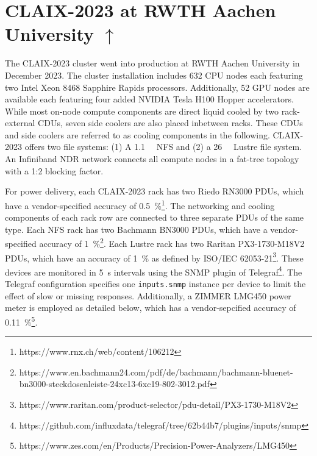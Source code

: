 \section[CLAIX-2023 at RWTH Aachen University]{CLAIX-2023 at RWTH Aachen University \hyperref[tab:examples-overview]{$\uparrow$}}
\label{sec:example-rwth-claix-2023}

The CLAIX-2023 cluster went into production at RWTH Aachen University in December 2023.
The cluster installation includes 632 CPU nodes each featuring two Intel Xeon 8468 Sapphire Rapids processors.
Additionally, 52 GPU nodes are available each featuring four added NVIDIA Tesla H100 Hopper accelerators.
While most on-node compute components are direct liquid cooled by two rack-external \acp{CDU}, seven side coolers are also placed inbetween racks.
These \acp{CDU} and side coolers are referred to as cooling components in the following.
CLAIX-2023 offers two file systems: (1) A \SI{1.1}{\peta\byte} NFS and (2) a \SI{26}{\peta\byte} Lustre file system.
An Infiniband NDR network connects all compute nodes in a fat-tree topology with a 1:2 blocking factor.

For power delivery, each CLAIX-2023 rack has two Riedo RN3000 \acp{PDU}, which have a vendor-specified accuracy of \SI{0.5}{\percent}\footnote{https://www.rnx.ch/web/content/106212}.
The networking and cooling components of each rack row are connected to three separate \acp{PDU} of the same type.
Each NFS rack has two Bachmann BN3000 \acp{PDU}, which have a vendor-specified accuracy of \SI{1}{\percent}\footnote{https://www.en.bachmann24.com/pdf/de/bachmann/bachmann-bluenet-bn3000-steckdosenleiste-24xc13-6xc19-802-3012.pdf}.
Each Lustre rack has two Raritan PX3-1730-M18V2 \acp{PDU}, which have an accuracy of \SI{1}{\percent} as defined by ISO/IEC 62053-21\footnote{https://www.raritan.com/product-selector/pdu-detail/PX3-1730-M18V2}.
These devices are monitored in \SI{5}{\second} intervals using the \ac{SNMP} plugin of Telegraf\footnote{https://github.com/influxdata/telegraf/tree/62b44b7/plugins/inputs/snmp}.
The Telegraf configuration specifies one \texttt{inputs.snmp} instance per device to limit the effect of slow or missing responses.
Additionally, a ZIMMER LMG450 power meter is employed as detailed below, which has a vendor-sepcified accuracy of \SI{0.11}{\percent}\footnote{https://www.zes.com/en/Products/Precision-Power-Analyzers/LMG450}.

